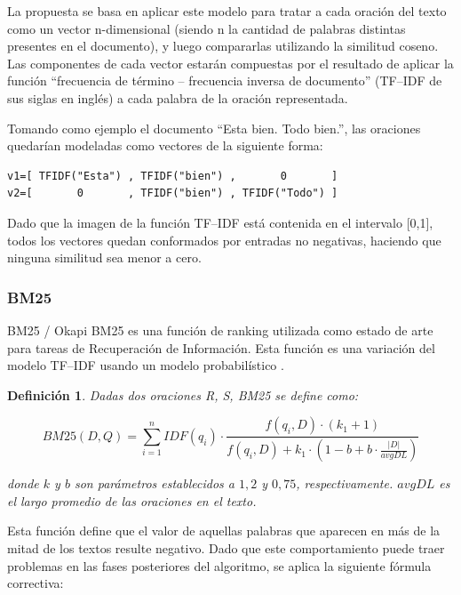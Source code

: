 \documentclass[a4paper]{article}
\newtheorem{definicion}{Definición}
\begin{document}
La propuesta se basa en aplicar este modelo para tratar a cada oración del texto como un vector n-dimensional (siendo n la cantidad de palabras distintas presentes en el documento), y luego compararlas utilizando la similitud coseno. Las componentes de cada vector estarán compuestas por el resultado de aplicar la función “frecuencia de término -- frecuencia inversa de documento” (TF--IDF de sus siglas en inglés) a cada palabra de la oración representada.

Tomando como ejemplo el documento “Esta bien. Todo bien.”, las oraciones quedarían modeladas como vectores de la siguiente forma:

\begin{Verbatim}[xleftmargin=3em]
v1=[ TFIDF("Esta") , TFIDF("bien") ,       0       ]
v2=[       0       , TFIDF("bien") , TFIDF("Todo") ]
\end{Verbatim}

Dado que la imagen de la función TF--IDF está contenida en el intervalo [0,1], todos los vectores quedan conformados por entradas no negativas, haciendo que ninguna similitud sea menor a cero. 


\subsubsection{BM25}
BM25 / Okapi BM25 es una función de ranking utilizada como estado de arte para tareas de Recuperación de Información. 
Esta función es una variación del modelo TF--IDF usando un modelo probabilístico \cite{robertson}.

\begin{definicion}
Dadas dos oraciones R, S, BM25 se define como:

\begin{equation}
BM25(D,Q) = \sum_{i=1}^{n} IDF(q_i) \cdot \frac{f(q_i, D) \cdot (k_1 + 1)}{f(q_i, D) + k_1 \cdot (1 - b + b \cdot \frac{|D|}{avgDL})}
\end{equation}

donde $k$ y $b$ son parámetros establecidos a $1,2$ y $0,75$, respectivamente. $avgDL$ es el largo promedio de las oraciones en el texto.
\end{definicion}

Esta función define que el valor de aquellas palabras que aparecen en más de la mitad de los textos resulte negativo. 
Dado que este comportamiento puede traer problemas en las fases posteriores del algoritmo, se aplica la siguiente fórmula correctiva:
                
\end{document}
